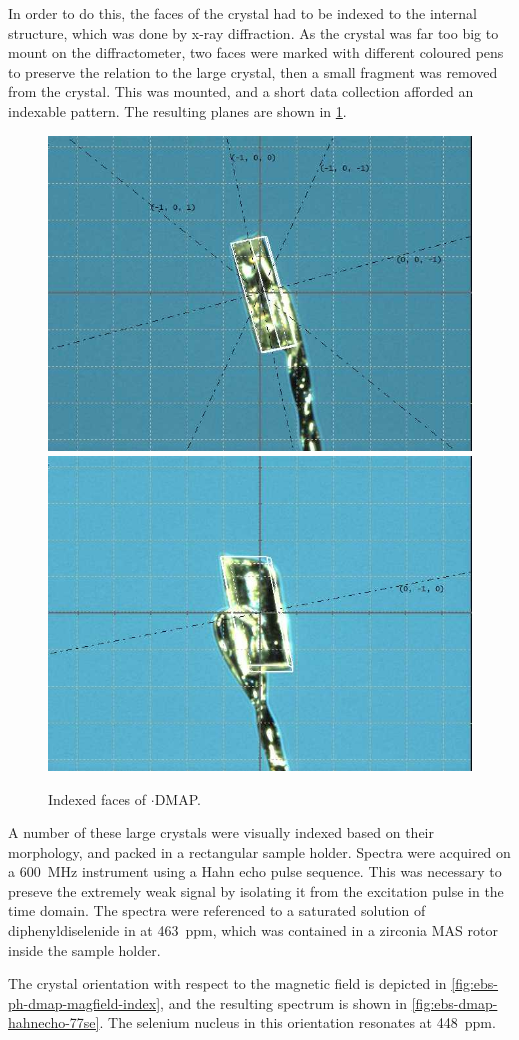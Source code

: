 \begin{refsection}
In order to do this, the faces of the crystal had to be indexed to the internal structure, which was done by x-ray diffraction.
As the crystal was far too big to mount on the diffractometer, two faces were marked with different coloured pens to preserve the relation to the large crystal, then a small fragment was removed from the crystal.
This was mounted, and a short data collection afforded an indexable pattern.
The resulting planes are shown in \cref{fig:ebs-ph-dmap-index}.

\begin{figure}
  \centering
  \includegraphics[width=0.48\linewidth]{Figures/xtal-b.jpg}
  \includegraphics[width=0.48\linewidth]{Figures/xtal-c.jpg}
  \caption{Indexed faces of $\cdot$DMAP.}
  \label{fig:ebs-ph-dmap-index}
\end{figure}

A number of these large crystals were visually indexed based on their morphology, and packed in a rectangular sample holder.
Spectra were acquired on a 600~MHz instrument using a Hahn echo pulse sequence.
This was necessary to preseve the extremely weak signal by isolating it from the excitation pulse in the time domain.
The spectra were referenced to a saturated solution of diphenyldiselenide in  at 463~ppm, which was contained in a zirconia MAS rotor inside the sample holder.\autocite{Duddeck1995}

The crystal orientation with respect to the magnetic field is depicted in \cref{fig:ebs-ph-dmap-magfield-index}, and the resulting spectrum is shown in \cref{fig:ebs-dmap-hahnecho-77se}.
The selenium nucleus in this orientation resonates at 448~ppm.


\end{refsection}
